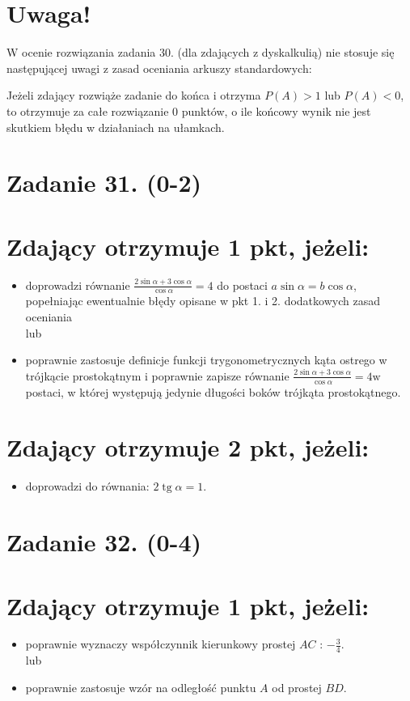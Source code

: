 \documentclass[10pt]{article}
\begin{document}
\section*{Uwaga!}
W ocenie rozwiązania zadania 30. (dla zdających z dyskalkulią) nie stosuje się następującej uwagi z zasad oceniania arkuszy standardowych:

Jeżeli zdający rozwiąże zadanie do końca i otrzyma $P(A)>1$ lub $P(A)<0$, to otrzymuje za całe rozwiązanie 0 punktów, o ile końcowy wynik nie jest skutkiem błędu w działaniach na ułamkach.

\section*{Zadanie 31. (0-2)}
\section*{Zdający otrzymuje 1 pkt, jeżeli:}
\begin{itemize}
  \item doprowadzi równanie $\frac{2 \sin \alpha+3 \cos \alpha}{\cos \alpha}=4$ do postaci $a \sin \alpha=b \cos \alpha$, popełniając ewentualnie błędy opisane w pkt 1. i 2. dodatkowych zasad oceniania\\
lub
  \item poprawnie zastosuje definicje funkcji trygonometrycznych kąta ostrego w trójkącie prostokątnym i poprawnie zapisze równanie $\frac{2 \sin \alpha+3 \cos \alpha}{\cos \alpha}=4 \mathrm{w}$ postaci, w której występują jedynie długości boków trójkąta prostokątnego.
\end{itemize}

\section*{Zdający otrzymuje 2 pkt, jeżeli:}
\begin{itemize}
  \item doprowadzi do równania: $2 \operatorname{tg} \alpha=1$.
\end{itemize}

\section*{Zadanie 32. (0-4)}
\section*{Zdający otrzymuje 1 pkt, jeżeli:}
\begin{itemize}
  \item poprawnie wyznaczy współczynnik kierunkowy prostej $A C$ : $-\frac{3}{4}$.\\
lub
  \item poprawnie zastosuje wzór na odległość punktu $A$ od prostej $B D$.
\end{itemize}
\end{document}

